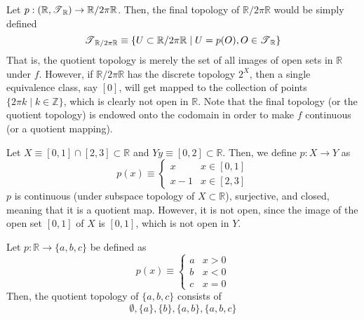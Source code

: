  \begin{example}
    Let $p: (\mathbb{R}, \operatorname{\mathscr{T}}_\mathbb{R}) \rightarrow \mathbb{R} / 2 \pi \mathbb{R}$. Then, the final topology of $\mathbb{R} / 2 \pi \mathbb{R}$ would be simply defined 
    \begin{equation}
      \operatorname{\mathscr{T}}_{\mathbb{R} / 2 \pi \mathbb{R}} \equiv \{U \subset \mathbb{R} / 2\pi \mathbb{R} \mid U = p(O), O \in \operatorname{\mathscr{T}}_\mathbb{R}\}
    \end{equation}
    That is, the quotient topology is merely the set of all images of open sets in $\mathbb{R}$ under $f$. However, if $\mathbb{R} / 2 \pi \mathbb{R}$ has the discrete topology $2^X$, then a single equivalence class, say $[0]$, will get mapped to the collection of points $\{2 \pi k \mid k \in \mathbb{Z}\}$, which is clearly not open in $\mathbb{R}$. Note that the final topology (or the quotient topology) is endowed onto the codomain in order to make $f$ continuous (or a quotient mapping). 
  \end{example}

  \begin{example}
    Let $X \equiv [0,1] \cap [2,3] \subset \mathbb{R}$ and $Y y \equiv [0,2] \subset \mathbb{R}$. Then, we define $p: X \rightarrow Y$ as 
    \begin{equation}
      p(x) \equiv \begin{cases} x & x \in [0,1] \\ x-1 & x \in [2,3] \end{cases}
    \end{equation}
    $p$ is continuous (under subspace topology of $X \subset \mathbb{R}$), surjective, and closed, meaning that it is a quotient map. However, it is not open, since the image of the open set $[0,1]$ of $X$ is $[0,1]$, which is not open in $Y$. 
  \end{example}

  \begin{example}
    Let $p: \mathbb{R} \rightarrow \{a, b, c\}$ be defined as 
    \begin{equation}
      p(x) \equiv \begin{cases} a & x > 0 \\ b & x < 0 \\ c & x = 0 \end{cases}
    \end{equation}
    Then, the quotient topology of $\{a, b, c\}$ consists of 
    \begin{equation}
      \emptyset, \{a\}, \{b\}, \{a, b\}, \{a, b, c\}
    \end{equation}
  \end{example}

